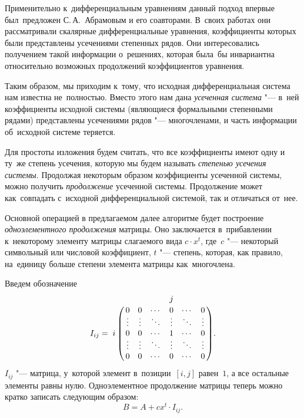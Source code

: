 Применительно к~дифференциальным уравнениям данный подход впервые был~предложен С.\,А.~Абрамовым и его соавторами.
В~своих работах \cite{litAbramovTruncatedSeries, litAbramovScalarEquations}
они рассматривали скалярные дифференциальные уравнения,
коэффициенты которых были представлены усечениями степенных рядов.
Они интересовались получением такой информации о~решениях,
которая была~бы инвариантна относительно возможных продолжений коэффициентов уравнения.

Таким образом, мы приходим к~тому, что исходная дифференциальная система нам известна не~полностью.
Вместо этого нам дана \emph{усеченная система} "--- в~ней коэффициенты исходной системы (являющиеся формальными степенными рядами) представлены
усечениями рядов "--- многочленами, и часть информации об~исходной системе теряется.

Для простоты изложения будем считать, что все коэффициенты имеют одну и ту~же степень усечения,
которую мы будем называть \emph{степенью усечения системы}.
Продолжая некоторым образом коэффициенты усеченной системы, можно получить \emph{продолжение} усеченной системы.
Продолжение может как~совпадать с~исходной дифференциальной системой, так и отличаться от~нее.

Основной операцией в предлагаемом далее алгоритме будет построение \emph{одноэлементного продолжения} матрицы.
Оно заключается в~прибавлении к~некоторому элементу матрицы слагаемого вида $c \cdot x^t$,
где~$c$ "--- некоторый символьный или числовой коэффициент,
$t$ "--- степень, которая, как правило, на~единицу больше степени элемента матрицы как~многочлена.

Введем обозначение
\begin{equation*}
	I_{ij} = 
	\bordermatrix{
		&           &         &        & j      &        &        \cr
		&   0       & 0       & \cdots & 0      & \cdots & 0      \cr
		&   \vdots  & \vdots  & \ddots & \vdots & \ddots & \vdots \cr
		i & 0       & 0       & \cdots & 1      & \cdots & 0      \cr
		&   \vdots  & \vdots  & \ddots & \vdots & \ddots & \vdots \cr
		&   0       & 0       & \cdots & 0      & \cdots & 0      \cr
	}.
\end{equation*}
$I_{ij}$ "--- матрица, у~которой элемент в~позиции~$[i, j]$ равен~$1$, а все остальные элементы равны нулю.
Одноэлементное продолжение матрицы теперь можно кратко записать следующим образом:
\begin{equation*}
	B = A + cx^t \cdot I_{ij}.
\end{equation*}

